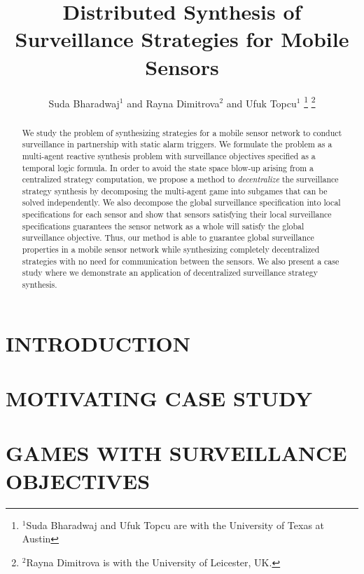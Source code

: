 \documentclass[letterpaper, 10 pt, conference]{ieeeconf}  %
\title{\LARGE \bf Distributed Synthesis of Surveillance Strategies for Mobile Sensors}
\author{Suda Bharadwaj$^{1}$ and Rayna Dimitrova$^{2}$ and Ufuk Topcu$^{1}$%
\thanks{$^{1}$Suda Bharadwaj and Ufuk Topcu are with the University of Texas at Austin}%
\thanks{$^{2}$Rayna Dimitrova is with the University of Leicester, UK.}%
}
\begin{document}
\maketitle
\thispagestyle{empty}
\pagestyle{empty}


\begin{abstract}
We study the problem of synthesizing strategies for a mobile sensor network to conduct surveillance in partnership with static alarm triggers. We formulate the problem as a multi-agent reactive synthesis problem with surveillance objectives specified as a temporal logic formula. In order to avoid the state space blow-up arising from a centralized strategy computation, we propose a method to \emph{decentralize} the surveillance strategy synthesis by decomposing the multi-agent game into subgames that can be solved independently. We also decompose the global surveillance specification into local specifications for each sensor and show that sensors satisfying their local surveillance specifications guarantees the sensor network as a whole will satisfy the global surveillance objective. Thus, our method is able to guarantee global surveillance properties in a mobile sensor network while synthesizing completely decentralized strategies with no need for communication between the sensors. We also present a case study where we demonstrate an application of decentralized surveillance strategy synthesis.
\end{abstract}


\section{INTRODUCTION}


\section{MOTIVATING CASE STUDY}\label{sec:casestudy}


\section{GAMES WITH SURVEILLANCE OBJECTIVES}

\end{document}
